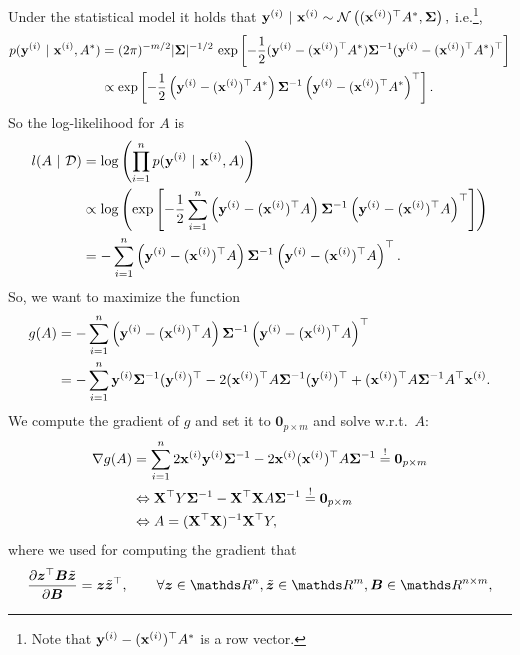\documentclass[a4paper]{article}
\begin{document}
{\begin{enumerate}
	Under the statistical model it holds that $\mathbf{y}^{(i)}~|~\mathbf{x}^{(i)} \sim \mathcal{N}\left(	(\mathbf{x}^{(i)})^\top A^*, \bm{\Sigma}	\right),$ i.e.\footnote{Note that $\mathbf{y}^{(i)} - (\mathbf{x}^{(i)})^\top A^* $ is a row vector.},
	\begin{align}\label{def_distr}
		p(\mathbf{y}^{(i)}~|~\mathbf{x}^{(i)},A^*) 
		&= (2\pi)^{-m/2} |\bm{\Sigma}|^{-1/2} \, \exp\left[	-\frac12 (\mathbf{y}^{(i)} - (\mathbf{x}^{(i)})^\top A^* )	\bm{\Sigma}^{-1} (\mathbf{y}^{(i)} - (\mathbf{x}^{(i)})^\top A^* )^\top	\right] \notag \\
		&\propto \exp\left[	-\frac12 \left(\mathbf{y}^{(i)} - (\mathbf{x}^{(i)})^\top A^* \right)	\bm{\Sigma}^{-1} \left(\mathbf{y}^{(i)} - (\mathbf{x}^{(i)})^\top A^* \right)^\top	\right] .
	\end{align}
	So the log-likelihood for $A$ is
	\begin{align*}
		l(A~|~\mathcal{D}) 
		&= \log\left(	\prod_{i=1}^n 		p(\mathbf{y}^{(i)}~|~\mathbf{x}^{(i)},A)	\right) \\
		&\propto \log\left(	 	\exp\left[	-\frac12 \sum_{i=1}^n \left(\mathbf{y}^{(i)} - (\mathbf{x}^{(i)})^\top A \right)	\bm{\Sigma}^{-1} \left(\mathbf{y}^{(i)} - (\mathbf{x}^{(i)})^\top A \right)^\top	\right]	\right) \\
		&= 	-\sum_{i=1}^n  \left(\mathbf{y}^{(i)} - (\mathbf{x}^{(i)})^\top A \right)	\bm{\Sigma}^{-1} \left(\mathbf{y}^{(i)} - (\mathbf{x}^{(i)})^\top A \right)^\top.		 
	\end{align*}
	So, we want to maximize the function 
	\begin{align*}
		g(A) 
		&= 	-\sum_{i=1}^n  \left(\mathbf{y}^{(i)} - (\mathbf{x}^{(i)})^\top A \right)	\bm{\Sigma}^{-1} \left(\mathbf{y}^{(i)} - (\mathbf{x}^{(i)})^\top A \right)^\top \\
		&= 	-\sum_{i=1}^n  \mathbf{y}^{(i)} \bm{\Sigma}^{-1} (\mathbf{y}^{(i)})^\top  
		- 2 (\mathbf{x}^{(i)})^\top A \bm{\Sigma}^{-1} (\mathbf{y}^{(i)})^\top 
		+ (\mathbf{x}^{(i)})^\top A	\bm{\Sigma}^{-1}  A^\top \mathbf{x}^{(i)}.	
	\end{align*}
	We compute the gradient of $g$ and set it to $\bm{0}_{p\times m}$ and solve w.r.t.\ $A:$
	\begin{align*}
		\nabla g(A) 
		&= 	\sum_{i=1}^n   2 \mathbf{x}^{(i)} \mathbf{y}^{(i)}   \bm{\Sigma}^{-1}
		- 2   \mathbf{x}^{(i)}	(\mathbf{x}^{(i)})^\top  A \bm{\Sigma}^{-1}   \stackrel{!}{=} \bm{0}_{p\times m} \\
		&\Leftrightarrow 	\mathbf{X}^\top Y  \bm{\Sigma}^{-1}
		-   \mathbf{X}^\top \mathbf{X}  A \bm{\Sigma}^{-1}   \stackrel{!}{=} \bm{0}_{p\times m} \\
		&\Leftrightarrow A = (\mathbf{X}^\top \mathbf{X})^{-1} \mathbf{X}^\top Y,	
	\end{align*}
	where we used for computing the gradient that 
	\begin{align*}
		&\frac{\partial \bm{z}^\top \bm{B} \tilde{\bm{z}} }{\partial  \bm{B} } = \bm{z} \tilde{\bm{z}}^\top, \qquad \forall \bm{z}\in\R^n,\tilde{\bm{z}}\in \R^{m}, \bm{B}\in\R^{n \times m}, \\

\end{align*}
\end{enumerate}}
\end{document}
